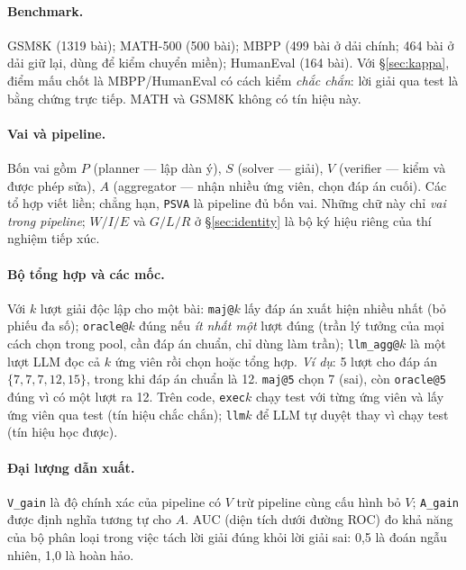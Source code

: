 \paragraph{Benchmark.} GSM8K \cite{cobbe2021} (1319 bài); MATH-500 \cite{hendrycks2021}
(500 bài); MBPP \cite{austin2021} (499 bài ở dải chính; 464 bài ở dải giữ lại, dùng để kiểm
chuyển miền); HumanEval \cite{chen2021} (164 bài). Với \S\ref{sec:kappa}, điểm mấu chốt là
MBPP/HumanEval có cách kiểm \emph{chắc chắn}: lời giải qua test là bằng chứng trực tiếp. MATH
và GSM8K không có tín hiệu này.

\paragraph{Vai và pipeline.} Bốn vai gồm $P$ (planner --- lập dàn ý), $S$ (solver --- giải),
$V$ (verifier --- kiểm và được phép sửa), $A$ (aggregator --- nhận nhiều ứng viên, chọn đáp án
cuối). Các tổ hợp viết liền; chẳng hạn, \texttt{PSVA} là pipeline đủ bốn vai. Những chữ này chỉ
\emph{vai trong pipeline}; $W/I/E$ và $G/L/R$ ở \S\ref{sec:identity} là bộ ký hiệu riêng của
thí nghiệm tiếp xúc.

\paragraph{Bộ tổng hợp và các mốc.} Với $k$ lượt giải độc lập cho một bài:
\texttt{maj@}$k$ lấy đáp án xuất hiện nhiều nhất (bỏ phiếu đa số);
\texttt{oracle@}$k$ đúng nếu \emph{ít nhất một} lượt đúng (trần lý tưởng của mọi cách chọn
trong pool, cần đáp án chuẩn, chỉ dùng làm trần);
\texttt{llm\_agg@}$k$ là một lượt LLM đọc cả $k$ ứng viên rồi chọn hoặc tổng hợp.
\emph{Ví dụ}: 5 lượt cho đáp án $\{7, 7, 7, 12, 15\}$, trong khi đáp án chuẩn là 12.
\texttt{maj@5} chọn 7 (sai), còn \texttt{oracle@5} đúng vì có một lượt ra 12. Trên code,
\texttt{exec}$k$ chạy test với từng ứng viên và lấy ứng viên qua test (tín hiệu chắc chắn);
\texttt{llm}$k$ để LLM tự duyệt thay vì chạy test (tín hiệu học được).

\paragraph{Đại lượng dẫn xuất.} \texttt{V\_gain} là độ chính xác của pipeline có $V$ trừ
pipeline cùng cấu hình bỏ $V$; \texttt{A\_gain} được định nghĩa tương tự cho $A$. AUC (diện
tích dưới đường ROC) đo khả năng của bộ phân loại trong việc tách lời giải đúng khỏi lời giải
sai: 0,5 là đoán ngẫu nhiên, 1,0 là hoàn hảo.

